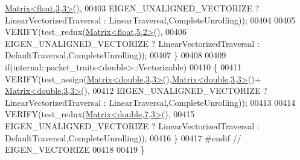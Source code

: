 \begin{DoxyCode}
      \hyperlink{group___core___module_class_eigen_1_1_matrix}{Matrix<float,3,3>}(),
00403       EIGEN\_UNALIGNED\_VECTORIZE ? LinearVectorizedTraversal : LinearTraversal,CompleteUnrolling));
00404       
00405     VERIFY(test\_redux(\hyperlink{group___core___module_class_eigen_1_1_matrix}{Matrix<float,5,2>}(),
00406       EIGEN\_UNALIGNED\_VECTORIZE ? LinearVectorizedTraversal : DefaultTraversal,CompleteUnrolling));
00407   \}
00408   
00409   \textcolor{keywordflow}{if}(internal::packet\_traits<double>::Vectorizable)
00410   \{
00411     VERIFY(test\_assign(\hyperlink{group___core___module_class_eigen_1_1_matrix}{Matrix<double,3,3>}(),\hyperlink{group___core___module_class_eigen_1_1_matrix}{Matrix<double,3,3>}()+
      \hyperlink{group___core___module_class_eigen_1_1_matrix}{Matrix<double,3,3>}(),
00412       EIGEN\_UNALIGNED\_VECTORIZE ? LinearVectorizedTraversal : LinearTraversal,CompleteUnrolling));
00413     
00414     VERIFY(test\_redux(\hyperlink{group___core___module_class_eigen_1_1_matrix}{Matrix<double,7,3>}(),
00415       EIGEN\_UNALIGNED\_VECTORIZE ? LinearVectorizedTraversal : DefaultTraversal,CompleteUnrolling));
00416   \}
00417 \textcolor{preprocessor}{#endif // EIGEN\_VECTORIZE}
00418 
00419 \}
\end{DoxyCode}
